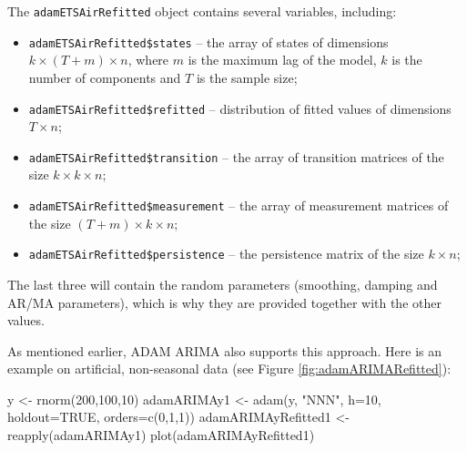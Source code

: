 \documentclass[
]{book}
\newenvironment{Shaded}{\begin{snugshade}}{\end{snugshade}}
\newcommand{\AttributeTok}[1]{\textcolor[rgb]{0.77,0.63,0.00}{#1}}
\newcommand{\ConstantTok}[1]{\textcolor[rgb]{0.00,0.00,0.00}{#1}}
\newcommand{\DecValTok}[1]{\textcolor[rgb]{0.00,0.00,0.81}{#1}}
\newcommand{\FunctionTok}[1]{\textcolor[rgb]{0.00,0.00,0.00}{#1}}
\newcommand{\NormalTok}[1]{#1}
\newcommand{\OtherTok}[1]{\textcolor[rgb]{0.56,0.35,0.01}{#1}}
\newcommand{\StringTok}[1]{\textcolor[rgb]{0.31,0.60,0.02}{#1}}
\providecommand{\tightlist}{%
  \setlength{\itemsep}{0pt}\setlength{\parskip}{0pt}}
\theoremstyle{definition}
\theoremstyle{definition}
\theoremstyle{definition}
\theoremstyle{definition}
\theoremstyle{remark}
\begin{document}
The \texttt{adamETSAirRefitted} object contains several variables, including:

\begin{itemize}
\tightlist
\item
  \texttt{adamETSAirRefitted\$states} -- the array of states of dimensions \(k \times (T+m) \times n\), where \(m\) is the maximum lag of the model, \(k\) is the number of components and \(T\) is the sample size;
\item
  \texttt{adamETSAirRefitted\$refitted} -- distribution of fitted values of dimensions \(T \times n\);
\item
  \texttt{adamETSAirRefitted\$transition} -- the array of transition matrices of the size \(k \times k \times n\);
\item
  \texttt{adamETSAirRefitted\$measurement} -- the array of measurement matrices of the size \((T+m) \times k \times n\);
\item
  \texttt{adamETSAirRefitted\$persistence} -- the persistence matrix of the size \(k \times n\);
\end{itemize}

The last three will contain the random parameters (smoothing, damping and AR/MA parameters), which is why they are provided together with the other values.

As mentioned earlier, ADAM ARIMA also supports this approach. Here is an example on artificial, non-seasonal data (see Figure \ref{fig:adamARIMARefitted}):

\begin{Shaded}
\begin{Highlighting}[]
\NormalTok{y }\OtherTok{\textless{}{-}} \FunctionTok{rnorm}\NormalTok{(}\DecValTok{200}\NormalTok{,}\DecValTok{100}\NormalTok{,}\DecValTok{10}\NormalTok{)}
\NormalTok{adamARIMAy1 }\OtherTok{\textless{}{-}} \FunctionTok{adam}\NormalTok{(y, }\StringTok{"NNN"}\NormalTok{, }\AttributeTok{h=}\DecValTok{10}\NormalTok{, }\AttributeTok{holdout=}\ConstantTok{TRUE}\NormalTok{,}
                    \AttributeTok{orders=}\FunctionTok{c}\NormalTok{(}\DecValTok{0}\NormalTok{,}\DecValTok{1}\NormalTok{,}\DecValTok{1}\NormalTok{))}
\NormalTok{adamARIMAyRefitted1 }\OtherTok{\textless{}{-}} \FunctionTok{reapply}\NormalTok{(adamARIMAy1)}
\FunctionTok{plot}\NormalTok{(adamARIMAyRefitted1)}
\end{Highlighting}
\end{Shaded}
\end{document}
